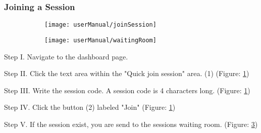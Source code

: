 \subsubsection{Joining a Session}

\begin{figure}[H]
	\begin{subfigure}{0.70\linewidth}
		\texttt{[image: userManual/joinSession]}
		\caption{}
		\label{fig:joinSession}
	\end{subfigure}
	\begin{subfigure}{0.70\linewidth}
		\texttt{[image: userManual/waitingRoom]}
		\caption{}
		\label{fig:waitingRoom}
	\end{subfigure}
\end{figure}

\begin{userManualItemlist}
	\item[Step I.] Navigate to the dashboard page.
	\item[Step II.] Click the text area within the "Quick join session" area. (1) (Figure: \ref{fig:joinSession})
	\item[Step III.] Write the session code. A session code is 4 characters long. (Figure: \ref{fig:joinSession})
	\item[Step IV.] Click the button (2) labeled "Join" (Figure: \ref{fig:joinSession}) 
	\item[Step V.] If the session exist, you are send to the sessions waiting room. (Figure: \ref{fig:waitingRoom})
\end{userManualItemlist}